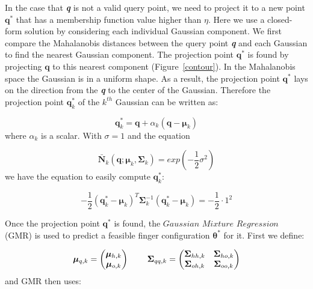 In the case that \textbf{\emph{q}} is not a valid query point, we need to project it to a new point $\boldsymbol{q}^*$ that has a membership function value higher than $\eta$. Here we use a closed-form solution by considering each individual Gaussian component. We first compare the Mahalanobis distances between the query point \textbf{\emph{q}} and each Gaussian to find the nearest Gaussian component. The projection point $\boldsymbol{q}^*$ is found by projecting $\boldsymbol{q}$ to this nearest component (Figure~\ref{contour}).
In the Mahalanobis space the Gaussian is in a uniform shape. As a result, the projection point $\boldsymbol{q}^*$  lays on the direction from the \textbf{\emph{q}} to the center of the Gaussian. Therefore the projection point $\boldsymbol{q}^*_k$ of the $k^{th}$ Gaussian can be written as:


\begin{equation}
\boldsymbol{q}^*_k = \boldsymbol{q} + \alpha_k(\boldsymbol{q}-\boldsymbol{\mu}_k)
\end{equation}
where $\alpha_k$ is a scalar. With $\sigma = 1$ and the equation

\begin{equation}
\bar{\boldsymbol{N}}_k(\boldsymbol{q};\boldsymbol{\mu}_k,\boldsymbol{\Sigma}_k) = exp(-\frac{1}{2}\sigma^2)
\end{equation}
we have the equation to easily compute $\boldsymbol{q}^*_k$:

\begin{equation}
-\frac{1}{2}(\boldsymbol{q}^*_k-\boldsymbol{\mu}_k)^{T}\boldsymbol{\Sigma}^{-1}_{k}(\boldsymbol{q}^*_k-\boldsymbol{\mu}_k) = -\frac{1}{2}\cdot{1}^{2}
\end{equation}

Once the projection point $\boldsymbol{q}^*$ is found, the $Gaussian$ $Mixture$ $Regression$ (GMR) is used to predict a feasible finger configuration $\boldsymbol\theta^*$ for it. First we define:

\begin{equation}
{
\boldsymbol{\mu}_{q,k} = \begin{pmatrix} \boldsymbol{\mu}_{h,k}    \\
                                        \boldsymbol{\mu}_{o,k}
                        \end{pmatrix}
\hspace{0.3in}
\boldsymbol{\Sigma}_{qq,k} =  \begin{pmatrix}  \boldsymbol{\Sigma}_{hh,k}  & \boldsymbol{\Sigma}_{ho,k}  \\
                                            \boldsymbol{\Sigma}_{oh,k}  & \boldsymbol{\Sigma}_{oo,k}
                            \end{pmatrix}
}
\end{equation}
and GMR then uses:

